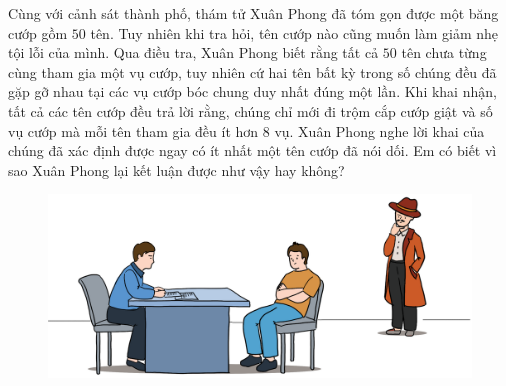 \begin{multicols}{2}
	Cùng với cảnh sát thành phố, thám tử Xuân Phong đã tóm gọn được một băng cướp gồm $50$ tên. Tuy nhiên khi tra hỏi, tên cướp nào cũng muốn làm giảm nhẹ tội lỗi của mình. Qua điều tra, Xuân Phong biết rằng tất cả $50$ tên chưa từng cùng tham gia một vụ cướp, tuy nhiên cứ hai tên bất kỳ trong số chúng đều đã gặp gỡ nhau tại các vụ cướp bóc chung duy nhất đúng một lần. Khi khai nhận, tất cả các tên cướp đều trả lời rằng, chúng chỉ mới đi trộm cắp cướp giật và số vụ cướp mà mỗi tên tham gia đều ít hơn $8$ vụ. Xuân Phong nghe lời khai của chúng đã xác định được ngay có ít nhất một tên cướp đã nói dối. Em có biết vì sao Xuân Phong lại kết luận được như vậy hay không?
\end{multicols}
\begin{figure}[H]
	\centering
	\vspace*{-15pt}
	\captionsetup{labelformat= empty, justification=centering}
	\includegraphics[width=0.85\linewidth]{xp}
	\vspace*{-10pt}
\end{figure}
